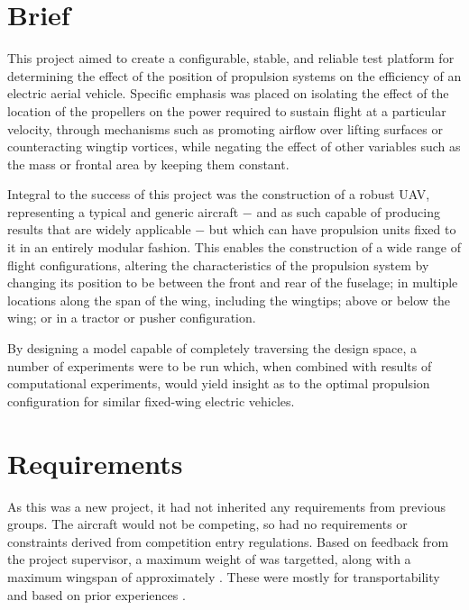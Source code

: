 \documentclass[../../main.tex]{subfiles}
\begin{document}


\section{Brief} \label{sec:design-specification:brief}

This project aimed to create a configurable, stable, and reliable test platform for determining the effect of the position of propulsion systems on the efficiency of an electric aerial vehicle.
Specific emphasis was placed on isolating the effect of the location of the propellers on the power required to sustain flight at a particular velocity, through mechanisms such as promoting airflow over lifting surfaces or counteracting wingtip vortices, while negating the effect of other variables such as the mass or frontal area by keeping them constant. 

Integral to the success of this project was the construction of a robust UAV, representing a typical and generic aircraft $-$ and as such capable of producing results that are widely applicable $-$ but which can have propulsion units fixed to it in an entirely modular fashion.
This enables the construction of a wide range of flight configurations, altering the characteristics of the propulsion system by changing its position to be between the front and rear of the fuselage; in multiple locations along the span of the wing, including the wingtips; above or below the wing; or in a tractor or pusher configuration. 

By designing a model capable of completely traversing the design space, a number of experiments were to be run which, when combined with results of computational experiments, would yield insight as to the optimal propulsion configuration for similar fixed-wing electric vehicles. 

\section{Requirements} \label{sec:design-specification:requirements}

As this was a new project, it had not inherited any requirements from previous groups. 
The aircraft would not be competing, so had no requirements or constraints derived from competition entry regulations. 
Based on feedback from the project supervisor, a maximum weight of  was targetted, along with a maximum wingspan of approximately .
These were mostly for transportability and based on prior experiences \cite{towell-19}.  %
\end{document}
